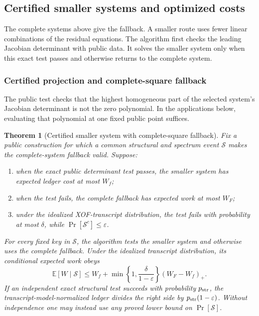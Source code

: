 \documentclass[11pt]{article}
\newtheorem{theorem}{Theorem}[section]
\begin{document}
\subsection{Certified smaller systems and optimized costs}
\label{sec:sq-l4}

The complete systems above give the fallback.  A smaller route uses fewer
linear combinations of the residual equations.  The algorithm first checks
the leading Jacobian determinant with public data.  It solves the smaller
system only when this exact test passes and otherwise returns to the complete
system.

\subsubsection{Certified projection and complete-square fallback}
\label{sec:sq-adaptive}

The public test checks that the highest homogeneous part of the selected
system's Jacobian determinant is not the zero polynomial.  In the applications
below, evaluating that polynomial at one fixed public point suffices.

\begin{theorem}[Certified smaller system with complete-square fallback]
\label{thm:sq-adaptive}
Fix a public construction for which a common structural and spectrum event
$\mathcal S$ makes the complete-system fallback valid.  Suppose:
\begin{enumerate}
\item when the exact public determinant test passes, the smaller system has
expected ledger cost at most $W_f$;
\item when the test fails, the complete fallback has expected work at most
$W_F$;
\item under the idealized XOF-transcript distribution, the test fails with
probability at most $\delta$, while
$\Pr[\mathcal S^c]\le\varepsilon$.
\end{enumerate}
For every fixed key in $\mathcal S$, the algorithm tests the smaller system
and otherwise uses the complete fallback.  Under the idealized transcript
distribution, its conditional expected work obeys
\begin{equation}
 \mathbb E[W\mid\mathcal S]
 \le W_f+
 \min\!\left\{1,\frac\delta{1-\varepsilon}\right\}
 (W_F-W_f)_+ .                                      \label{eq:sq-adaptive-work}
\end{equation}
If an independent exact structural test succeeds with probability
$p_{\rm str}$, the transcript-model-normalized ledger divides the right side by
$p_{\rm str}(1-\varepsilon)$.  Without independence one may instead use any
proved lower bound on $\Pr[\mathcal S]$.
\end{theorem}
\end{document}
